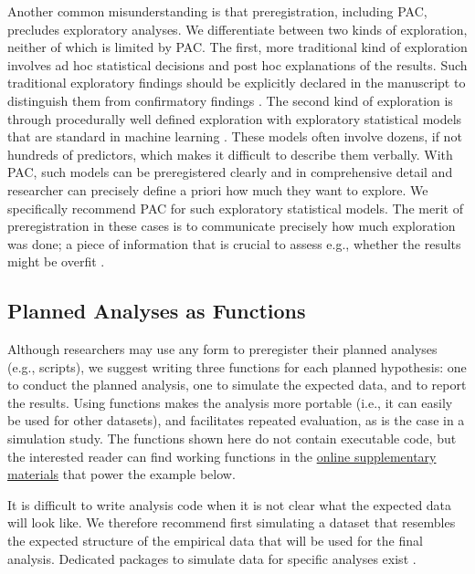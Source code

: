 \documentclass[psych,tutorial,submit,moreauthors,pdftex]{mdpi}
\begin{document}
Another common misunderstanding is that preregistration, including PAC,
precludes exploratory analyses. We differentiate between two kinds of
exploration, neither of which is limited by PAC. The first, more
traditional kind of exploration involves ad hoc statistical decisions
and post hoc explanations of the results. Such traditional exploratory
findings should be explicitly declared in the manuscript to distinguish
them from confirmatory findings
\citep{NosekRevolution2018, nosekPreregistrationHardWorthwhile2019}. The
second kind of exploration is through procedurally well defined
exploration with exploratory statistical models that are standard in
machine learning \citep{brandmaier22mlsem}. These models often involve
dozens, if not hundreds of predictors, which makes it difficult to
describe them verbally. With PAC, such models can be preregistered
clearly and in comprehensive detail and researcher can precisely define
a priori how much they want to explore. We specifically recommend PAC
for such exploratory statistical models. The merit of preregistration in
these cases is to communicate precisely how much exploration was done; a
piece of information that is crucial to assess e.g., whether the results
might be overfit
\citep[p.~220f.]{hastieElementsStatisticalLearning2017}.

\hypertarget{planned-analyses-as-functions}{%
\subsection{Planned Analyses as
Functions}\label{planned-analyses-as-functions}}

Although researchers may use any form to preregister their planned
analyses (e.g., scripts), we suggest writing three functions for each
planned hypothesis: one to conduct the planned analysis, one to simulate
the expected data, and to report the results. Using functions makes the
analysis more portable (i.e., it can easily be used for other datasets),
and facilitates repeated evaluation, as is the case in a simulation
study. The functions shown here do not contain executable code, but the
interested reader can find working functions in the
\href{https://github.com/aaronpeikert/repro-tutorial/blob/main/R/simulation_funs.R}{online
supplementary materials} that power the example below.

It is difficult to write analysis code when it is not clear what the
expected data will look like. We therefore recommend first simulating a
dataset that resembles the expected structure of the empirical data that
will be used for the final analysis. Dedicated packages to simulate data
for specific analyses exist .
\end{document}
